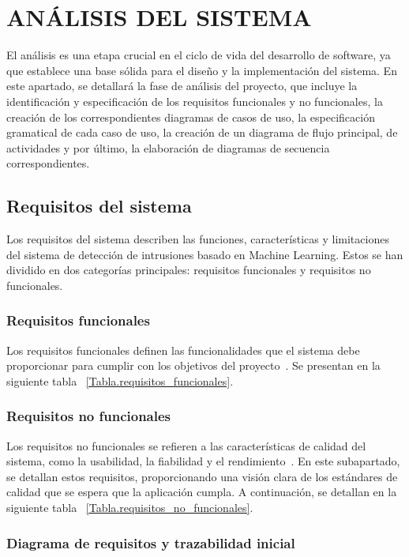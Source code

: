 \chapter{ANÁLISIS DEL SISTEMA}
El análisis es una etapa crucial en el ciclo de vida del desarrollo de software, ya que establece una base sólida para el diseño y la implementación del sistema. En este apartado, se detallará la fase de análisis del proyecto, que incluye la identificación y especificación de los requisitos funcionales y no funcionales, la creación de los correspondientes diagramas de casos de uso, la especificación gramatical de cada caso de uso, la creación de un diagrama de flujo principal, de actividades y por último, la elaboración de diagramas de secuencia correspondientes.
\section{Requisitos del sistema}
Los requisitos del sistema describen las funciones, características y limitaciones del sistema de detección de intrusiones basado en Machine Learning. Estos se han dividido en dos categorías principales: requisitos funcionales y requisitos no funcionales.
\subsection{Requisitos funcionales}
Los requisitos funcionales definen las funcionalidades que el sistema debe proporcionar para cumplir con los objetivos del proyecto~\cite{iso29148}. Se presentan en la siguiente tabla ~\ref{Tabla.requisitos_funcionales}.


\subsection{Requisitos no funcionales}
Los requisitos no funcionales se refieren a las características de calidad del sistema, como la usabilidad, la fiabilidad y el rendimiento~\cite{iso29148}. En este subapartado, se detallan estos requisitos, proporcionando una visión clara de los estándares de calidad que se espera que la aplicación cumpla. A continuación, se detallan en la siguiente tabla ~\ref{Tabla.requisitos_no_funcionales}.



\subsection{Diagrama de requisitos y trazabilidad inicial}

